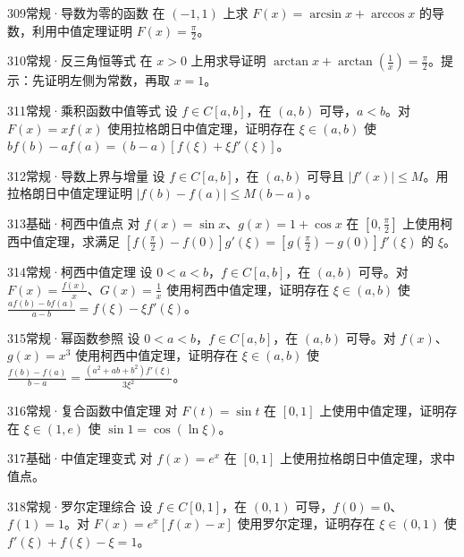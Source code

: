 \begin{exercise}{309}{常规·导数为零的函数}
在 $(-1,1)$ 上求 $F(x)=\arcsin x+\arccos x$ 的导数，利用中值定理证明 $F(x)=\frac{\pi}{2}$。
\end{exercise}
\begin{exercise}{310}{常规·反三角恒等式}
在 $x>0$ 上用求导证明 $\arctan x+\arctan(\frac{1}{x})=\frac{\pi}{2}$。提示：先证明左侧为常数，再取 $x=1$。
\end{exercise}
\begin{exercise}{311}{常规·乘积函数中值等式}
设 $f\in C[a,b]$，在 $(a,b)$ 可导，$a<b$。对 $F(x)=xf(x)$ 使用拉格朗日中值定理，证明存在 $\xi\in(a,b)$ 使 $bf(b)-af(a)=(b-a)[f(\xi)+\xi f'(\xi)]$。
\end{exercise}
\begin{exercise}{312}{常规·导数上界与增量}
设 $f\in C[a,b]$，在 $(a,b)$ 可导且 $|f'(x)|\le M$。用拉格朗日中值定理证明 $|f(b)-f(a)|\le M(b-a)$。
\end{exercise}
\begin{exercise}{313}{基础·柯西中值点}
对 $f(x)=\sin x$、$g(x)=1+\cos x$ 在 $[0,\frac{\pi}{2}]$ 上使用柯西中值定理，求满足 $[f(\frac{\pi}{2})-f(0)]g'(\xi)=[g(\frac{\pi}{2})-g(0)]f'(\xi)$ 的 $\xi$。
\end{exercise}
\begin{exercise}{314}{常规·柯西中值定理}
设 $0<a<b$，$f\in C[a,b]$，在 $(a,b)$ 可导。对 $F(x)=\frac{f(x)}{x}$、$G(x)=\frac{1}{x}$ 使用柯西中值定理，证明存在 $\xi\in(a,b)$ 使 $\frac{af(b)-bf(a)}{a-b}=f(\xi)-\xi f'(\xi)$。
\end{exercise}
\begin{exercise}{315}{常规·幂函数参照}
设 $0<a<b$，$f\in C[a,b]$，在 $(a,b)$ 可导。对 $f(x)$、$g(x)=x^3$ 使用柯西中值定理，证明存在 $\xi\in(a,b)$ 使 $\frac{f(b)-f(a)}{b-a}=\frac{(a^2+ab+b^2)f'(\xi)}{3\xi^2}$。
\end{exercise}
\begin{exercise}{316}{常规·复合函数中值定理}
对 $F(t)=\sin t$ 在 $[0,1]$ 上使用中值定理，证明存在 $\xi\in(1,e)$ 使 $\sin1=\cos(\ln\xi)$。
\end{exercise}
\begin{exercise}{317}{基础·中值定理变式}
对 $f(x)=e^x$ 在 $[0,1]$ 上使用拉格朗日中值定理，求中值点。
\end{exercise}
\begin{exercise}{318}{常规·罗尔定理综合}
设 $f\in C[0,1]$，在 $(0,1)$ 可导，$f(0)=0$、$f(1)=1$。对 $F(x)=e^x[f(x)-x]$ 使用罗尔定理，证明存在 $\xi\in(0,1)$ 使 $f'(\xi)+f(\xi)-\xi=1$。
\end{exercise}

